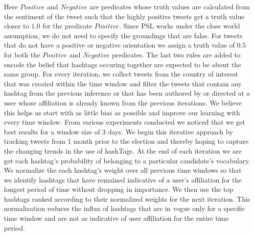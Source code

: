Here $Positive$ and $Negative$ are predicates whose truth values are calculated from the sentiment of the tweet such that the highly positive tweets get a truth value closer to $1.0$ for the predicate $Positive$. 
Since PSL works under the close world assumption, we do not need to specify the groundings that are false.
For tweets that do not have a positive or negative orientation we assign a truth value of $0.5$ for both the $Positive$ and $Negative$ predicates.
The last two rules are added to encode the belief that hashtags occuring together are expected to be about the same group.
For every iteration, we collect tweets from the country of interest that was created within the time window and filter the tweets that contain any hashtag from the previous inference  or that has been authored by or directed at a user whose affiliation is already known from the previous iterations.
We believe this helps us start with as little bias as possible and improve our learning with every time window.
From various experiments conducted we noticed that we get best results for a window size of 3 days. 
We begin this iterative approach by tracking tweets from 1 month prior to the election and thereby hoping to capture the changing trends in the use of hashTags.
At the end of each iteration we are get each hashtag's probability of belonging to a particular candidate's vocabulary. 
We normalize the each hashtag's weight over all previous time windows so that we identify hashtags that have remained indicative of a user's affiliation for the longest period of time without dropping in importance. 
We then use the top hashtags ranked according to their normalized weights  for the next iteration.
This normalization reduces the influx of hashtags that are in vogue only for a specific time window and are not as indicative of user affiliation for the entire time period. 
